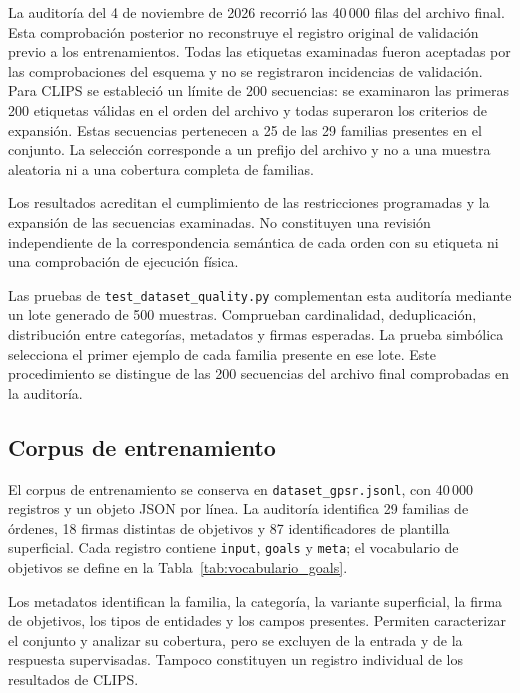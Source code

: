 La auditoría del 4 de noviembre de 2026 recorrió las 40\,000 filas
del archivo final. Esta comprobación posterior no reconstruye el
registro original de validación previo a los entrenamientos. Todas las
etiquetas examinadas fueron aceptadas por las comprobaciones del esquema y no se
registraron incidencias de validación. Para CLIPS se estableció un
límite de 200 secuencias: se examinaron las primeras 200 etiquetas
válidas en el orden del archivo y todas superaron los criterios de
expansión. Estas secuencias pertenecen a 25 de las 29 familias presentes
en el conjunto. La selección corresponde a un prefijo del archivo y
no a una muestra aleatoria ni a una cobertura completa de familias.

Los resultados acreditan el cumplimiento de las restricciones
programadas y la expansión de las secuencias examinadas. No constituyen
una revisión independiente de la correspondencia semántica de cada
orden con su etiqueta ni una comprobación de ejecución física.

Las pruebas de \texttt{test\_\allowbreak dataset\_\allowbreak quality.\allowbreak py} complementan esta
auditoría mediante un lote generado de 500 muestras. Comprueban
cardinalidad, deduplicación, distribución entre categorías, metadatos
y firmas esperadas. La prueba simbólica selecciona el primer ejemplo
de cada familia presente en ese lote. Este procedimiento se distingue
de las 200 secuencias del archivo final comprobadas en la auditoría.

\subsection{Corpus de entrenamiento}

El corpus de entrenamiento se conserva en \texttt{dataset\_\allowbreak gpsr.\allowbreak jsonl}, con
40\,000 registros y un objeto JSON por línea. La auditoría identifica
29 familias de órdenes, 18 firmas distintas de objetivos y 87
identificadores de plantilla superficial. Cada registro contiene
\texttt{input}, \texttt{goals} y \texttt{meta}; el vocabulario de
objetivos se define en la Tabla~\ref{tab:vocabulario_goals}.

Los metadatos identifican la familia, la categoría, la variante
superficial, la firma de objetivos, los tipos de entidades y los campos
presentes. Permiten caracterizar el conjunto y analizar su cobertura,
pero se excluyen de la entrada y de la respuesta supervisadas. Tampoco
constituyen un registro individual de los resultados de CLIPS.

